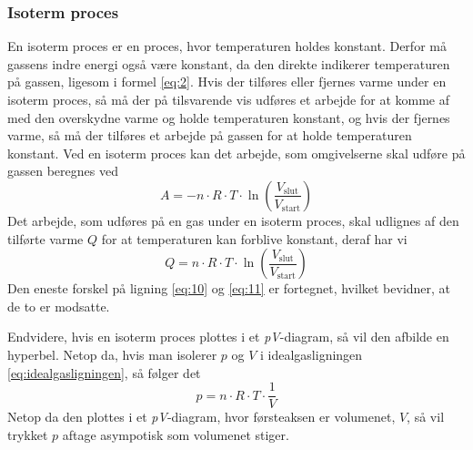\documentclass[SRC.tex]{subfiles}
\begin{document}
	\subsubsection{Isoterm proces}
	En isoterm proces er en proces, hvor temperaturen holdes konstant. 
	Derfor må gassens indre energi også være konstant, da den direkte 
	indikerer temperaturen på gassen, ligesom i formel \eqref{eq:2}.
	Hvis der tilføres eller fjernes varme under en 
	isoterm proces, så må der på tilsvarende vis udføres et arbejde for
	at komme af med den overskydne varme og holde temperaturen konstant,
	og hvis der fjernes varme, så må der tilføres et arbejde på gassen
	for at holde temperaturen konstant. Ved en isoterm proces kan det 
	arbejde, som omgivelserne skal udføre på gassen beregnes ved
	\begin{equation}
	A = -n \cdot R \cdot T \cdot \ln\left(\frac{V_{\text{slut}}}{V_{\text{start}}}\right)
	\label{eq:10}
	\end{equation}
	Det arbejde, som udføres på en gas under en isoterm proces, skal 
	udlignes af den tilførte varme \(Q\) for at temperaturen kan forblive
	konstant, deraf har vi
	\begin{equation}
	Q = n \cdot R \cdot T \cdot \ln\left(\frac{V_{\text{slut}}}{V_{\text{start}}}\right)
	\label{eq:11}
	\end{equation}
	Den eneste forskel på ligning \eqref{eq:10} og \eqref{eq:11} er fortegnet,
	hvilket bevidner, at de to er modsatte.
	
	Endvidere, hvis en isoterm proces plottes i et \textit{pV}-diagram, så 
	vil den afbilde en hyperbel. Netop da, hvis man isolerer \(p\) og \(V\)
	i idealgasligningen \eqref{eq:idealgasligningen}, så følger det
	\begin{equation}
	p = n \cdot R \cdot T \cdot \frac{1}{V}
	\end{equation}
	Netop da den plottes i et \textit{pV}-diagram, hvor førsteaksen er volumenet,
	\(V\), så vil trykket \(p\) aftage asympotisk som volumenet stiger. 
\end{document}
